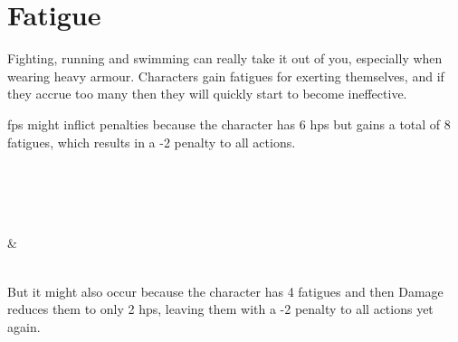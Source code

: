 \section{Fatigue}

\begin{multicols}{2}

\label{fatigue}

\noindent
Fighting, running and swimming can really take it out of you, especially when wearing heavy armour.
Characters gain \glspl{fatigue} for exerting themselves, and if they accrue too many then they will quickly start to become ineffective.



\Glspl{fp} might inflict penalties because the character has 6 \glspl{hp} but gains a total of 8 \glspl{fatigue}, which results in a -2 penalty to all actions.

\begin{boxtable}[lllllllllX]

   \\
    \statCircle
  \\
   \Square
  \\
   \\
   \Square & \Square \\
   \\

\end{boxtable}

But it might also occur because the character has 4 \glspl{fatigue} and then Damage reduces them to only 2 \glspl{hp}, leaving them with a -2 penalty to all actions yet again.

\begin{boxtable}[lllllllllX]

   \\
    \statCircle
  \\
     \Square
  \\
   \\
    \Square \\
   \\


\end{boxtable}
\end{multicols}

